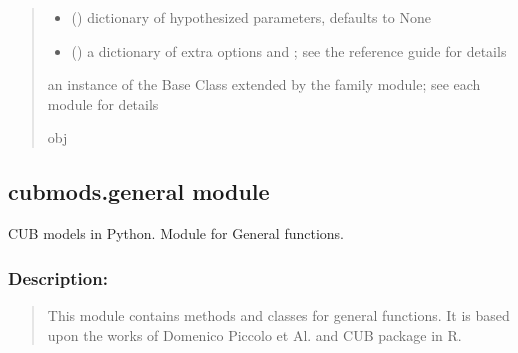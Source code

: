 \documentclass[letterpaper,10pt,english]{sphinxmanual}
\begin{document}
\begin{fulllineitems}
\begin{quote}
\begin{description}
\begin{itemize}
\item {} 
\sphinxAtStartPar
{} (\sphinxstyleliteralemphasis{\sphinxupquote{, }}) \textendash{} dictionary of hypothesized parameters, defaults to None

\item {} 
\sphinxAtStartPar
{} () \textendash{} a dictionary of extra options  and ; see the reference
guide for details

\end{itemize}

\sphinxAtStartPar
an instance of the Base Class  extended by the family module;
see each module for details

\sphinxAtStartPar
obj

\end{description}\end{quote}

\end{fulllineitems}



\subsection{cubmods.general module}
\label{\detokenize{cubmods:module-cubmods.general}}\label{\detokenize{cubmods:cubmods-general-module}}
\sphinxAtStartPar
CUB models in Python.
Module for General functions.


\subsubsection{Description:}
\label{\detokenize{cubmods:id677}}\begin{quote}

\sphinxAtStartPar
This module contains methods and classes
for general functions.
It is based upon the works of Domenico
Piccolo et Al. and CUB package in R.
\end{quote}
\end{document}
